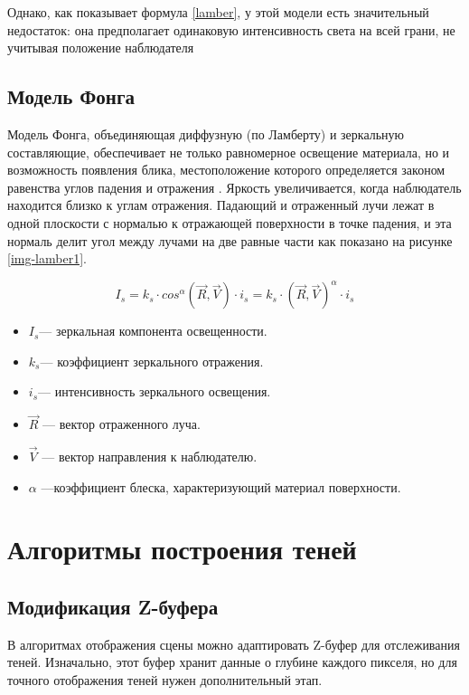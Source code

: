 
Однако, как показывает формула \ref{lamber}, у этой модели есть значительный недостаток: она предполагает одинаковую интенсивность света на всей грани, не учитывая положение наблюдателя


\subsection{Модель Фонга}
 
 Модель Фонга, объединяющая диффузную (по Ламберту) и зеркальную составляющие, обеспечивает не только равномерное освещение материала, но и возможность появления блика, местоположение которого определяется законом равенства углов падения и отражения \cite{lightmod}. Яркость увеличивается, когда наблюдатель находится близко к углам отражения. Падающий и отраженный лучи лежат в одной плоскости с нормалью к отражающей поверхности в точке падения, и эта нормаль делит угол между лучами на две равные части как показано на рисунке \ref{img-lamber1}.
 

\begin{equation}
	I_{s}=k_{s} \cdot cos^{\alpha}(\vec R, \vec V) \cdot i_{s} = k_{s} \cdot (\vec R, \vec V)^{\alpha} \cdot i_{s}
\end{equation}

\begin{itemize}
	\item 	$I_{s}$​ --- зеркальная компонента освещенности.
	\item $k_{s}$​ --- коэффициент зеркального отражения.
	\item $i_{s}$​ --- интенсивность зеркального освещения.
	\item $\vec R$ --- вектор отраженного луча.
	\item $\vec V$ --- вектор направления к наблюдателю.
	\item $\alpha$ ---коэффициент блеска, характеризующий материал поверхности.
\end{itemize}


\section{Алгоритмы построения теней}


\subsection{Модификация  Z-буфера}
В алгоритмах отображения сцены можно адаптировать Z-буфер для отслеживания теней. Изначально, этот буфер хранит данные о глубине каждого пикселя, но для точного отображения теней нужен дополнительный этап.




